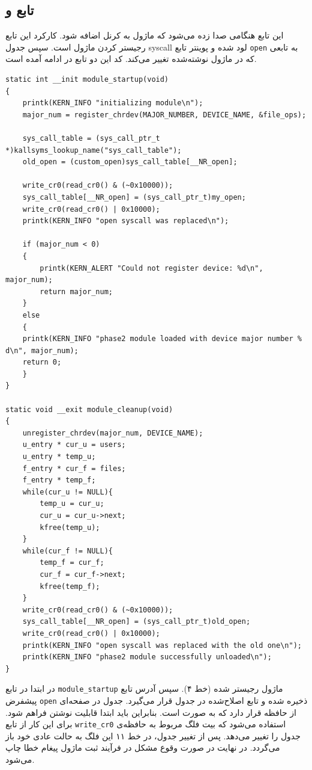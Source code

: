 \documentclass[13pt]{article}
\begin{document}
	 \subsection{تابع  و }
	این تابع هنگامی صدا زده می‌شود که ماژول به کرنل اضافه شود. کارکرد این تابع رجیستر کردن ماژول است. سپس جدول syscall لود شده و پوینتر تابع 
	\texttt{open}
	به تابعی که در ماژول نوشته‌شده تغییر می‌کند. کد این دو تابع در ادامه آمده است.
	 \lstset{escapechar=@,style=customc}
	 \begin{latin}
	 	\begin{lstlisting}
static int __init module_startup(void)
{
	printk(KERN_INFO "initializing module\n");
	major_num = register_chrdev(MAJOR_NUMBER, DEVICE_NAME, &file_ops);

	sys_call_table = (sys_call_ptr_t *)kallsyms_lookup_name("sys_call_table");
	old_open = (custom_open)sys_call_table[__NR_open];

	write_cr0(read_cr0() & (~0x10000));
	sys_call_table[__NR_open] = (sys_call_ptr_t)my_open;
	write_cr0(read_cr0() | 0x10000);
	printk(KERN_INFO "open syscall was replaced\n");

	if (major_num < 0)
	{
		printk(KERN_ALERT "Could not register device: %d\n", major_num);
		return major_num;
	}
	else
	{
	printk(KERN_INFO "phase2 module loaded with device major number % d\n", major_num);
	return 0;
	}
}

static void __exit module_cleanup(void)
{
	unregister_chrdev(major_num, DEVICE_NAME);
	u_entry * cur_u = users;
	u_entry * temp_u;
	f_entry * cur_f = files;
	f_entry * temp_f;
	while(cur_u != NULL){
		temp_u = cur_u;
		cur_u = cur_u->next;
		kfree(temp_u);
	}
	while(cur_f != NULL){
		temp_f = cur_f;
		cur_f = cur_f->next;
		kfree(temp_f);
	}
	write_cr0(read_cr0() & (~0x10000));
	sys_call_table[__NR_open] = (sys_call_ptr_t)old_open;    
	write_cr0(read_cr0() | 0x10000);
	printk(KERN_INFO "open syscall was replaced with the old one\n");
	printk(KERN_INFO "phase2 module successfully unloaded\n");
}\end{lstlisting}
	 \end{latin}
 \vspace{-2\baselineskip}
 	در ابتدا در تابع 
 	\texttt{module\_startup}
 	 ماژول رجیستر شده (خط ۴). سپس آدرس تابع پیشفرض 
 	 \texttt{open}
 	 ذخیره شده و تابع اصلاح‌شده در جدول قرار می‌گیرد. جدول
 	 در صفحه‌ای از حافظه قرار دارد که به صورت 
 	  است. بنابراین باید ابتدا قابلیت نوشتن فراهم شود. برای این کار از تابع 
 	  \texttt{write\_cr0}
 	  استفاده می‌شود که بیت فلگ مربوط به حافظه‌ی جدول را تغییر می‌دهد. پس از تغییر جدول، در خط ۱۱ این فلگ به حالت عادی خود باز می‌گردد. در نهایت در صورت وقوع مشکل در فرآیند ثبت ماژول پیغام خطا چاپ می‌شود.
 	  
\end{document}

